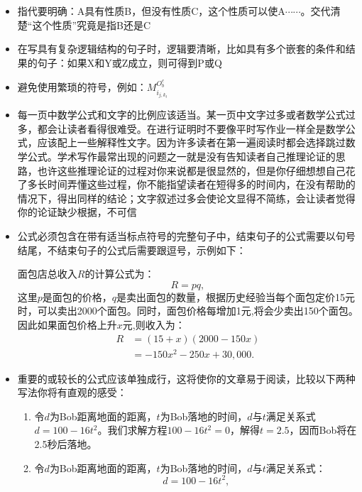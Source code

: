 \documentclass{formatBook}
\begin{document}
\begin{itemize}
    \item 指代要明确：A具有性质B，但没有性质C，这个性质可以使A$\cdots\cdots$。交代清楚“这个性质”究竟是指B还是C
    \item 在写具有复杂逻辑结构的句子时，逻辑要清晰，比如具有多个嵌套的条件和结果的句子：如果X和Y或Z成立，则可得到P或Q
    \item 避免使用繁琐的符号，例如：$M_{i_{j, k_{t}}}^{O_{b}^{c}}$
    \item 每一页中数学公式和文字的比例应该适当。某一页中文字过多或者数学公式过多，都会让读者看得很难受。在进行证明时不要像平时写作业一样全是数学公式，应该配上一些解释性文字。因为许多读者在第一遍阅读时都会选择跳过数学公式。学术写作最常出现的问题之一就是没有告知读者自己推理论证的思路，也许这些推理论证的过程对你来说都是很显然的，但是你仔细想想自己花了多长时间弄懂这些过程，你不能指望读者在短得多的时间内，在没有帮助的情况下，得出同样的结论；文字叙述过多会使论文显得不简练，会让读者觉得你的论证缺少根据，不可信
    \item 公式必须包含在带有适当标点符号的完整句子中，结束句子的公式需要以句号结尾，不结束句子的公式后需要跟逗号，示例如下：\par
    面包店总收入$R$的计算公式为：
    \begin{equation*}
           R=pq,
    \end{equation*}    
    这里$p$是面包的价格，$q$是卖出面包的数量，根据历史经验当每个面包定价15元时，可以卖出2000个面包。同时，面包价格每增加1元,将会少卖出150个面包。因此如果面包价格上升$x$元,则收入为：
    \begin{equation*}
    \begin{split}
        R&=(15+x)(2000-150x)\\
        &=-150x^{2}-250x+30,000.
    \end{split}
    \end{equation*}
    \item 重要的或较长的公式应该单独成行，这将使你的文章易于阅读，比较以下两种写法你将有直观的感受：
    \begin{enumerate}
        \item 令$d$为Bob距离地面的距离，$t$为Bob落地的时间，$d$与$t$满足关系式$d = 100 − 16t^{2}$。我们求解方程$100 − 16t^{2} = 0$，解得$t =2.5$，因而Bob将在2.5秒后落地。
        \item 令$d$为Bob距离地面的距离，$t$为Bob落地的时间，$d$与$t$满足关系式：
             \begin{equation*}
             d = 100 − 16t^{2},
             \end{equation*}

\end{enumerate}
\end{itemize}
\end{document}
